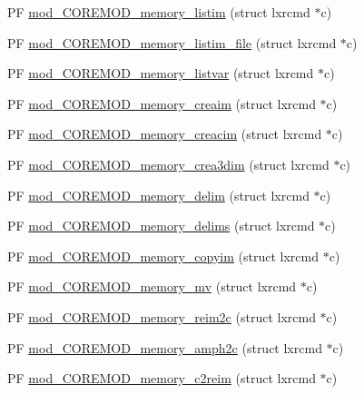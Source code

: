 \begin{DoxyCompactItemize}
\item 
P\+F \hyperlink{COREMOD__memory-util_8c_ac8d0f1f80414b71adbae2592d9ad4af5}{mod\+\_\+\+C\+O\+R\+E\+M\+O\+D\+\_\+memory\+\_\+listim} (struct lxrcmd $\ast$c)
\item 
P\+F \hyperlink{COREMOD__memory-util_8c_a8a114cc202662e53948d49cbd1c24215}{mod\+\_\+\+C\+O\+R\+E\+M\+O\+D\+\_\+memory\+\_\+listim\+\_\+file} (struct lxrcmd $\ast$c)
\item 
P\+F \hyperlink{COREMOD__memory-util_8c_a173fc6213f3d9b5e6564a1e3e33fbc8a}{mod\+\_\+\+C\+O\+R\+E\+M\+O\+D\+\_\+memory\+\_\+listvar} (struct lxrcmd $\ast$c)
\item 
P\+F \hyperlink{COREMOD__memory-util_8c_a85535a68fa2604715174985843da67dd}{mod\+\_\+\+C\+O\+R\+E\+M\+O\+D\+\_\+memory\+\_\+creaim} (struct lxrcmd $\ast$c)
\item 
P\+F \hyperlink{COREMOD__memory-util_8c_afb8072ed78b21728e71528e598c2e90d}{mod\+\_\+\+C\+O\+R\+E\+M\+O\+D\+\_\+memory\+\_\+creacim} (struct lxrcmd $\ast$c)
\item 
P\+F \hyperlink{COREMOD__memory-util_8c_a09f3a118a1210d0e15800f50eaf81e2c}{mod\+\_\+\+C\+O\+R\+E\+M\+O\+D\+\_\+memory\+\_\+crea3dim} (struct lxrcmd $\ast$c)
\item 
P\+F \hyperlink{COREMOD__memory-util_8c_a39875c37399e211d9c719151e13b5bb2}{mod\+\_\+\+C\+O\+R\+E\+M\+O\+D\+\_\+memory\+\_\+delim} (struct lxrcmd $\ast$c)
\item 
P\+F \hyperlink{COREMOD__memory-util_8c_a830b002e9da6d2dc3074d608c90196d7}{mod\+\_\+\+C\+O\+R\+E\+M\+O\+D\+\_\+memory\+\_\+delims} (struct lxrcmd $\ast$c)
\item 
P\+F \hyperlink{COREMOD__memory-util_8c_a5aaadd3c7687d102e2c4895034afd952}{mod\+\_\+\+C\+O\+R\+E\+M\+O\+D\+\_\+memory\+\_\+copyim} (struct lxrcmd $\ast$c)
\item 
P\+F \hyperlink{COREMOD__memory-util_8c_a34a6828fbc7ebc1a853f73cb22d424ec}{mod\+\_\+\+C\+O\+R\+E\+M\+O\+D\+\_\+memory\+\_\+mv} (struct lxrcmd $\ast$c)
\item 
P\+F \hyperlink{COREMOD__memory-util_8c_afce60e26804712fdb9dbe59f25fe1eff}{mod\+\_\+\+C\+O\+R\+E\+M\+O\+D\+\_\+memory\+\_\+reim2c} (struct lxrcmd $\ast$c)
\item 
P\+F \hyperlink{COREMOD__memory-util_8c_abceffdcf049bab39e5757955893f11c5}{mod\+\_\+\+C\+O\+R\+E\+M\+O\+D\+\_\+memory\+\_\+amph2c} (struct lxrcmd $\ast$c)
\item 
P\+F \hyperlink{COREMOD__memory-util_8c_ae37ffb77b7ef8d398d7c6b3bd0586495}{mod\+\_\+\+C\+O\+R\+E\+M\+O\+D\+\_\+memory\+\_\+c2reim} (struct lxrcmd $\ast$c)

\end{DoxyCompactItemize}
